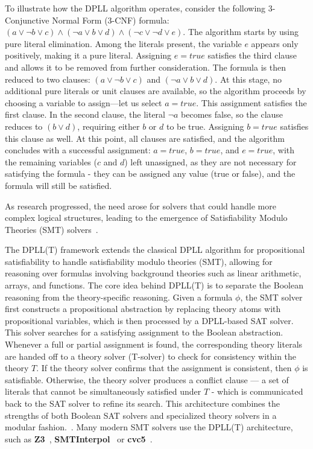 To illustrate how the DPLL algorithm operates, consider the following 3-Conjunctive Normal Form (3-CNF) formula: $(a \vee \neg b \vee c) \wedge (\neg a \vee b \vee d) \wedge (\neg c \vee \neg d \vee e)$. The algorithm starts by using pure literal elimination. Among the literals present, the variable $e$ appears only positively, making it a pure literal. Assigning $e = true$ satisfies the third clause and allows it to be removed from further consideration. The formula is then reduced to two clauses: $(a \vee \neg b \vee c)$ and $(\neg a \vee b \vee d)$. At this stage, no additional pure literals or unit clauses are available, so the algorithm proceeds by choosing a variable to assign—let us select $a = true$. This assignment satisfies the first clause. In the second clause, the literal $\neg a$ becomes false, so the clause reduces to $(b \vee d)$, requiring either $b$ or $d$ to be true. Assigning $b = true$ satisfies this clause as well. At this point, all clauses are satisfied, and the algorithm concludes with a successful assignment: $a = true$, $b = true$, and $e = true$, with the remaining variables ($c$ and $d$) left unassigned, as they are not necessary for satisfying the formula - they can be assigned any value (true or false), and the formula will still be satisfied.

As research progressed, the need arose for solvers that could handle more complex logical structures, leading to the emergence of Satisfiability Modulo Theories (SMT) solvers~\cite{shostak_algorithm_1978, boyer_integrating_1988-1}.

The DPLL(T) framework extends the classical DPLL algorithm for propositional satisfiability to handle satisfiability modulo theories (SMT), allowing for reasoning over formulas involving background theories such as linear arithmetic, arrays, and functions. The core idea behind DPLL(T) is to separate the Boolean reasoning from the theory-specific reasoning. Given a formula $\phi$, the SMT solver first constructs a propositional abstraction by replacing theory atoms with propositional variables, which is then processed by a DPLL-based SAT solver. This solver searches for a satisfying assignment to the Boolean abstraction. Whenever a full or partial assignment is found, the corresponding theory literals are handed off to a theory solver (T-solver) to check for consistency within the theory $T$. If the theory solver confirms that the assignment is consistent, then $\phi$ is satisfiable. Otherwise, the theory solver produces a conflict clause — 
a set of literals that cannot be simultaneously satisfied under $T$ - which is communicated back to the SAT solver to refine its search. This architecture combines the strengths of both Boolean SAT solvers and specialized theory solvers in a modular fashion.~\citet{nieuwenhuis_solving_2006}.
Many modern SMT solvers use the DPLL(T) architecture, such as \textbf{Z3}~\cite{de_moura_z3_2008}, \textbf{SMTInterpol}~\cite{hutchison_smtinterpol_2012} or \textbf{cvc5}~\cite{barbosa_cvc5_2022}.



